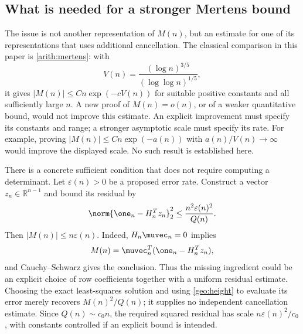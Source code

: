 \subsection{What is needed for a stronger Mertens bound}\label{disc:mertens-improvement}

The issue is not another representation of $M(n)$, but an estimate for one of its representations that uses additional cancellation. The classical comparison in this paper is \eqref{arith:mertens}: with
\[
 V(n)=\frac{(\log n)^{3/5}}{(\log\log n)^{1/5}},
\]
it gives $|M(n)|\le Cn\exp(-cV(n))$ for suitable positive constants and all sufficiently large $n$. A new proof of $M(n)=o(n)$, or of a weaker quantitative bound, would not improve this estimate. An explicit improvement must specify its constants and range; a stronger asymptotic scale must specify its rate. For example, proving $|M(n)|\le Cn\exp(-a(n))$ with $a(n)/V(n)\to\infty$ would improve the displayed scale. No such result is established here.

There is a concrete sufficient condition that does not require computing a determinant. Let $\varepsilon(n)>0$ be a proposed error rate. Construct a vector $z_n\in\mathbb R^{n-1}$ and bound its residual by
\begin{equation}\label{disc:certificate}
 \norm{\one_n-H_n^Tz_n}_2^2
 \le \frac{n^2\varepsilon(n)^2}{Q(n)}.
\end{equation}
Then $|M(n)|\le n\varepsilon(n)$. Indeed, $H_n\muvec_n=0$ implies
\[
 M(n)=\muvec_n^T(\one_n-H_n^Tz_n),
\]
and Cauchy--Schwarz gives the conclusion. Thus the missing ingredient could be an explicit choice of row coefficients together with a uniform residual estimate. Choosing the exact least-squares solution and using \eqref{geo:height} to evaluate its error merely recovers $M(n)^2/Q(n)$; it supplies no independent cancellation estimate. Since $Q(n)\sim c_0n$, the required squared residual has scale $n\varepsilon(n)^2/c_0$, with constants controlled if an explicit bound is intended.

